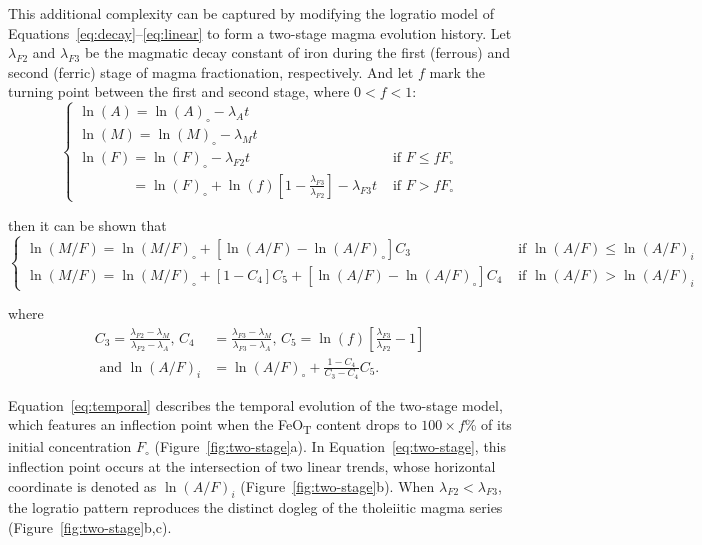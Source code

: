 \documentclass{article}
\begin{document}
This additional complexity can be captured by modifying the logratio
model of Equations~\ref{eq:decay}--\ref{eq:linear} to form a two-stage
magma evolution history. Let $\lambda_{F2}$ and $\lambda_{F3}$ be the
magmatic decay constant of iron during the first (ferrous) and second
(ferric) stage of magma fractionation, respectively.  And let $f$ mark
the turning point between the first and second stage, where $0<f<1$:
\begin{equation}
\begin{cases}
  \ln(A) = \ln(A)_\circ - \lambda_At &\\
  \ln(M) = \ln(M)_\circ - \lambda_Mt &\\
  \ln(F) = \ln(F)_\circ - \lambda_{F2}t &
  \mbox{~if~} F \leq {f}{F_\circ}\\
  \phantom{\ln(F)}  = \ln(F)_\circ +
  \ln(f)\left[1-\frac{\lambda_{F3}}{\lambda_{F2}}\right] -
  \lambda_{F3}t & \mbox{~if~}F > {f}{F_\circ}
\end{cases}
\label{eq:temporal}
\end{equation}

\noindent then it can be shown that
\begin{equation}
\begin{cases}
  \ln(M/F) = \ln(M/F)_\circ +
  \left[\ln(A/F)-\ln(A/F)_\circ\right]C_3 &
  \mbox{~if~}\ln(A/F) \leq \ln(A/F)_i\\
  \ln(M/F) = \ln(M/F)_\circ + \left[1-C_4\right]C_5 +
  \left[\ln(A/F)-\ln(A/F)_\circ\right]C_4 &
  \mbox{~if~}\ln(A/F) > \ln(A/F)_i
\end{cases}
\label{eq:two-stage}
\end{equation}

\noindent where
\begin{align}
  C_3 = \frac{\lambda_{F2}-\lambda_{M}}{\lambda_{F2}-\lambda_{A}}\mbox{,~}
  C_4 & = \frac{\lambda_{F3}-\lambda_{M}}{\lambda_{F3}-\lambda_{A}}\mbox{,~}
  C_5 = \ln(f)\left[\frac{\lambda_{F3}}{\lambda_{F2}}-1\right]\\ \label{eq:C345}
  \mbox{~and~}
  \ln(A/F)_i & = \ln(A/F)_\circ + \frac{1-C_4}{C_3-C_4}C_5.
\end{align}

Equation~\ref{eq:temporal} describes the temporal evolution of the
two-stage model, which features an inflection point when the
FeO\textsubscript{T} content drops to ${100}\times{f}$\% of its
initial concentration $F_\circ$ (Figure~\ref{fig:two-stage}a). In
Equation~\ref{eq:two-stage}, this inflection point occurs at the
intersection of two linear trends, whose horizontal coordinate is
denoted as $\ln(A/F)_i$ (Figure~\ref{fig:two-stage}b). When
$\lambda_{F2}<\lambda_{F3}$, the logratio pattern reproduces the
distinct dogleg of the tholeiitic magma series
(Figure~\ref{fig:two-stage}b,c).\medskip
\end{document}
